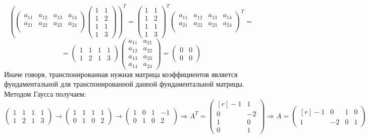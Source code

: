 \documentclass[a4paper,12pt]{article} %
\begin{document}
\begin{equation*}\left(
\begin{pmatrix*}
a_{11}&a_{12}&a_{13}&a_{14}\\
a_{21}&a_{22}&a_{23}&a_{24}\\
\end{pmatrix*}\begin{pmatrix*}
1&1\\
1&2\\
1&1\\
1&3
\end{pmatrix*}\right)^{T}=\begin{pmatrix*}
1&1\\
1&2\\
1&1\\
1&3
\end{pmatrix*}^{T}
    \begin{pmatrix*}
a_{11}&a_{12}&a_{13}&a_{14}\\
a_{21}&a_{22}&a_{23}&a_{24}\\
\end{pmatrix*}^{T}=
\end{equation*}
\begin{equation}
=\begin{pmatrix*}
1&1&1&1\\
1&2&1&3
\end{pmatrix*}\begin{pmatrix*}
a_{11}&a_{21}\\
a_{12}&a_{22}\\
a_{13}&a_{23}\\
a_{14}&a_{24}
\end{pmatrix*}
=\begin{pmatrix*}
0&0\\
0&0
\end{pmatrix*}
\label{eqn:SOLE2}
\end{equation}
Иначе говоря, транспонированная нужная матрица коэффициентов является фундаментальной для транспонированной данной фундаментальной матрицы.\\
Методом Гаусса получаем:
\begin{equation}
\begin{pmatrix*}
1&1&1&1\\
1&2&1&3
\end{pmatrix*}\rightarrow\begin{pmatrix*}
1&1&1&1\\
0&1&0&2
\end{pmatrix*}\rightarrow\begin{pmatrix*}
1&0&1&-1\\
0&1&0&2
\end{pmatrix*}\Rightarrow A^{T}=\begin{pmatrix*}[r]
-1&1\\
0&-2\\
1&0\\
0&1
\end{pmatrix*}\Rightarrow A=\begin{pmatrix*}[r]
-1&0&1&0\\
1&-2&0&1
\end{pmatrix*}
\label{eqn:SOLE3}
\end{equation}
\end{document}

